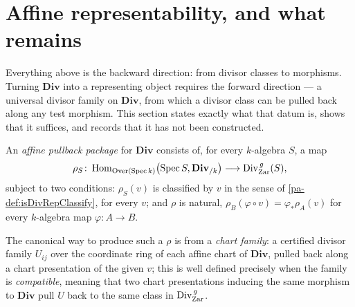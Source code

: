 \section{Affine representability, and what remains}
\label{pa-sec:divrep}

Everything above is the backward direction: from divisor classes to morphisms. Turning
\(\mathbf{Div}\) into a representing object requires the forward direction --- a universal
divisor family on \(\mathbf{Div}\), from which a divisor class can be pulled back along any
test morphism. This section states exactly what that datum is, shows that it suffices, and
records that it has not been constructed.

\begin{definition}
  \label{pa-def:divRepAffinePullback}
  \leanok

  An \emph{affine pullback package} for \(\mathbf{Div}\) consists of, for every
  \(k\)-algebra \(S\), a map
  \[
    \rho_S \colon \operatorname{Hom}_{\mathrm{Over}(\operatorname{Spec} k)}\bigl(\operatorname{Spec} S, \mathbf{Div}_{/k}\bigr)
      \longrightarrow \operatorname{Div}^{\,g}_{\mathrm{Zar}}(S),
  \]
  subject to two conditions: \(\rho_S(v)\) is classified by \(v\) in the sense of
  \ref{pa-def:isDivRepClassify}, for every \(v\); and \(\rho\) is natural, \(\rho_B(\varphi
  \circ v) = \varphi_* \rho_A(v)\) for every \(k\)-algebra map \(\varphi \colon A \to B\).

  The canonical way to produce such a \(\rho\) is from a \emph{chart family}: a certified
  divisor family \(U_{ij}\) over the coordinate ring of each affine chart of
  \(\mathbf{Div}\), pulled back along a chart presentation of the given \(v\); this is well
  defined precisely when the family is \emph{compatible}, meaning that two chart
  presentations inducing the same morphism to \(\mathbf{Div}\) pull \(U\) back to the same
  class in \(\operatorname{Div}^{\,g}_{\mathrm{Zar}}\).
\end{definition}

